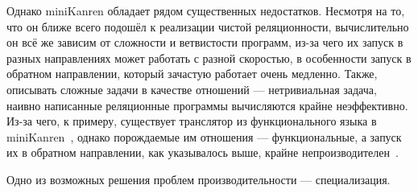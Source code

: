 
Однако miniKanren обладает рядом существенных недостатков. Несмотря на то,
что он ближе всего подошёл к реализации чистой реляционности, вычислительно
он всё же зависим от сложности и ветвистости программ, из-за чего их запуск в
разных направлениях может работать с разной скоростью, в особенности запуск в обратном направлении,
который зачастую работает очень медленно.
Также, описывать сложные задачи в качестве отношений --- нетривиальная задача,
наивно написанные реляционные программы вычисляются крайне неэффективно.
Из-за чего, к примеру, существует транслятор из функционального языка в
miniKanren~\cite{trconv}, однако порождаемые им отношения --- функциональные,
а запуск их в обратном направлении, как указывалось выше, крайне
непроизводителен~\cite{lozov}.

Одно из возможных решения проблем производительности --- специализация.
